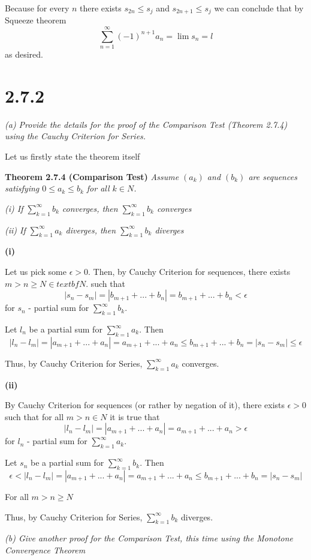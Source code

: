 \documentclass[11pt,oneside,titlepage]{article}
\begin{document}
Because for every $n$ there exists $s_{2n} \leq s_j$ and
$s_{2n + 1} \leq s_j$
we can conclude that by Squeeze theorem
$$\sum_{n = 1}^{\infty} (-1)^{n + 1}a_n = \lim{s_n} = l$$
as desired.

\section*{2.7.2}
\textit{(a) Provide the details for the proof of the Comparison Test
  (Theorem 2.7.4) using the Cauchy Criterion for Series.}

Let us firstly state the theorem itself

\textbf{Theorem 2.7.4 (Comparison Test)}
\textit{Assume $(a_k)$ and $(b_k)$ are sequences satisfying
  $0 \leq a_k \leq b_k$ for all $k \in N$.}

\textit{(i) If $\sum^{\infty}_{k = 1}b_k$ converges,
  then $\sum^{\infty}_{k = 1}b_k$ converges}

\textit{(ii) If $\sum^{\infty}_{k = 1}a_k$ diverges,
  then $\sum^{\infty}_{k = 1}b_k$ diverges}

\textbf{ (i)}

Let us pick some $\epsilon > 0$. Then, by Cauchy Criterion for sequences,
there exists $m > n \geq N \in textbf{N}$.
such that 
$$|s_n - s_m| = |b_{m + 1} + ... + b_n| = b_{m + 1} + ... + b_n < \epsilon$$
for $s_n$ - partial sum for $\sum^{\infty}_{k = 1}b_k$.

Let $l_n$ be a partial sum for $\sum^{\infty}_{k = 1}a_k$. Then
$$|l_n - l_m| = |a_{m + 1} + ... + a_n| = a_{m + 1} + ... + a_n \leq
b_{m + 1} + ... + b_n = |s_n - s_m| \leq \epsilon$$

Thus, by Cauchy Criterion for Series,  $\sum^{\infty}_{k = 1}a_k$ converges.

\textbf{(ii)}

By Cauchy Criterion for sequences (or rather by negation of it),
there exists $\epsilon > 0$ such that 
for all  $m > n \in N$ it is true that 
$$|l_n - l_m| = |a_{m + 1} + ... + a_n| = a_{m + 1} + ... + a_n > \epsilon$$
for $l_n$ - partial sum for $\sum^{\infty}_{k = 1}a_k$.

Let $s_n$ be a partial sum for $\sum^{\infty}_{k = 1}b_k$. Then
$$\epsilon < |l_n - l_m| = |a_{m + 1} + ... + a_n| = a_{m + 1} + ... + a_n \leq
b_{m + 1} + ... + b_n = |s_n - s_m|$$

For all $m > n \geq N$ 

Thus, by Cauchy Criterion for Series,  $\sum^{\infty}_{k = 1}b_k$ diverges.

\textit{(b) Give another proof for the Comparison Test, this time using the
  Monotone Convergence Theorem}
\end{document}
